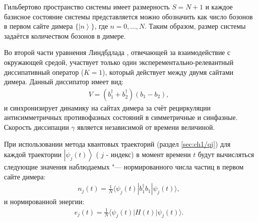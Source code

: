 Гильбертово пространство системы имеет размерность \(S = N + 1\) и каждое базисное состояние системы представляется можно обозначить как число бозонов в первом сайте димера \( \lbrace \left|n\right>\rbrace\), где \(n = 0,\ldots,N\). Таким образом, размер системы задаётся количеством бозонов в димере.

Во второй части уравнения Линдбдлада , отвечающей за взаимодействие с окружающей средой, участвует только один эксперементально-релевантный \cite{Diehl2008, Kraus2008} диссипативный оператор (\(K=1\)), который действует между двумя сайтами димера. Данный диссипатор имеет вид:
\begin{equation}
	\label{eq:dimer_diss}
	\begin{gathered}
		V = ( b^\dagger_1 + b^\dagger_2) \left( b_1 - b_2 \right),
	\end{gathered}
\end{equation}
и синхронизирует динамику на сайтах димера за счёт рециркуляции антисимметричных противофазных состояний в симметричные и синфазные. Скорость диссипации \(\gamma\) является независимой от времени величиной.

При использовании метода квантовых траекторий (раздел \cref{sec:ch1/qj}) для каждой траектории \(\left| \psi_j(t) \right\rangle\) ( \(j\) - индекс) в момент времени \(t\) будут вычисляться следующие значения наблюдаемых "--- нормированного числа частиц в первом сайте димера:
\begin{equation}
	\label{eq:dimer_num_bosons}
	\begin{gathered}
		n_j(t) =  \frac{1}{N}\langle \psi_j(t)| b^\dagger_1 b_1 | \psi_j(t) \rangle,
	\end{gathered}
\end{equation}
и нормированной энергии:
\begin{equation}
	\label{eq:dimer_energy}
	\begin{gathered}
		e_j(t) = \frac{1}{N} \langle \psi_j(t)| H(t) | \psi_j(t) \rangle.
	\end{gathered}
\end{equation}

